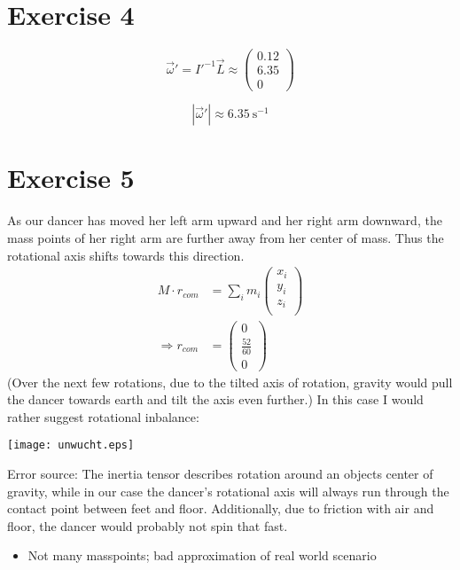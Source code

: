 \documentclass[10pt,DIV10,a4paper]{scrartcl}
\begin{document}
\section*{Exercise 4}

$$\vec{\omega}' = I'^{-1}\vec{L} \approx \left(\begin{array}{r}
0.12\\
6.35\\
0
\end{array}\right)$$

$$|\vec{\omega}'| \approx 6.35\ \text{s}^{-1}$$

\section*{Exercise 5}

As our dancer has moved her left arm upward and her right arm downward, the mass points of her right arm are further away from her center of mass. Thus the rotational axis shifts towards this direction.
\begin{align*}
M\cdot r_{com}&=\sum_i m_i \left( \begin{array}{r}
x_i\\
y_i\\
z_i\\
\end{array} \right) \\
\Rightarrow r_{com}&=\left(\begin{array}{r}
0\\
\frac{52}{60}\\
0
\end{array} \right)
\end{align*}
(Over the next few rotations, due to the tilted axis of rotation, gravity would pull the dancer towards earth and tilt the axis even further.)
In this case I would rather suggest rotational inbalance:

\texttt{[image: unwucht.eps]}

Error source: The inertia tensor describes rotation around an objects center of gravity, while in our case the dancer's rotational axis will always run through the contact point between feet and floor. Additionally, due to friction with air and floor, the dancer would probably not spin that fast.
\begin{itemize}
\item Not many masspoints; bad approximation of real world scenario
\end{itemize}
\end{document}
